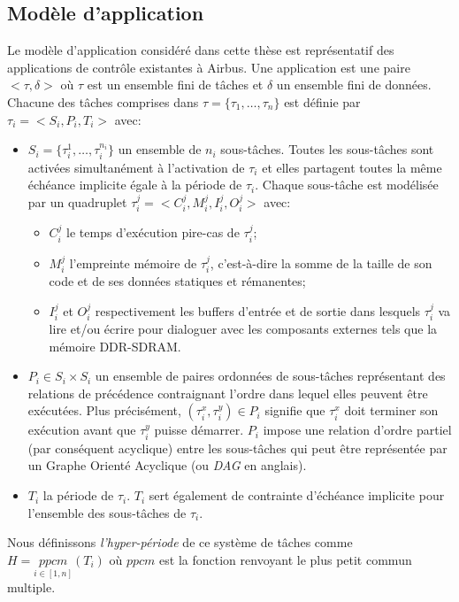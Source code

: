 \documentclass[main.tex]{subfiles}
\begin{document}
\subsection{Modèle d'application}
\label{ssec_resumeFr_appModel}
Le modèle d'application considéré dans cette thèse est représentatif des applications de contrôle existantes à Airbus. Une application est une paire $<\tau,\delta>$ où $\tau$ est un ensemble fini de tâches et $\delta$ un ensemble fini de données. Chacune des tâches comprises dans $\tau = \{ \tau_1 , \ldots , \tau_n \}$ est définie par $\tau_i = <S_i , P_i , T_i>$ avec:
\begin{itemize}
    \item $S_i = \{ \tau_i^1 , \ldots , \tau_i^{n_i} \}$ un ensemble de $n_i$ sous-tâches. Toutes les sous-tâches sont activées simultanément à l'activation de $\tau_i$ et elles partagent toutes la même échéance implicite égale à la période de $\tau_i$. Chaque sous-tâche est modélisée par un quadruplet $\tau_i^j = < C_i^j, M_i^j, I_i^j, O_i^j >$ avec:
        \begin{itemize}
            \item $C_i^j$ le temps d'exécution pire-cas de $\tau_i^j$;
            \item $M_i^j$ l'empreinte mémoire de $\tau_i^j$, c'est-à-dire la somme de la taille de son code et de ses données statiques et rémanentes;
            \item $I_i^j$ et $O_i^j$ respectivement les buffers d'entrée et de sortie dans lesquels $\tau_i^j$ va lire et/ou écrire pour dialoguer avec les composants externes tels que la mémoire DDR-SDRAM.
        \end{itemize}
    \item $P_i \in S_i \times S_i$ un ensemble de paires ordonnées de sous-tâches représentant des relations de précédence contraignant l'ordre dans lequel elles peuvent être exécutées. Plus précisément, $(\tau_i^x,\tau_i^y) \in P_i$ signifie que $\tau_i^x$ doit terminer son exécution avant que $\tau_i^y$ puisse démarrer. $P_i$ impose une relation d'ordre partiel (par conséquent acyclique) entre les sous-tâches qui peut être représentée par un Graphe Orienté Acyclique (ou \emph{DAG} en anglais).
    \item $T_i$ la période de $\tau_i$. $T_i$ sert également de contrainte d'échéance implicite pour l'ensemble des sous-tâches de $\tau_i$.
\end{itemize}

Nous définissons \emph{l'hyper-période} de ce système de tâches comme $H = \underset{i \in [1,n]}{ppcm} (T_i)$ où $ppcm$ est la fonction renvoyant le plus petit commun multiple.
\end{document}
